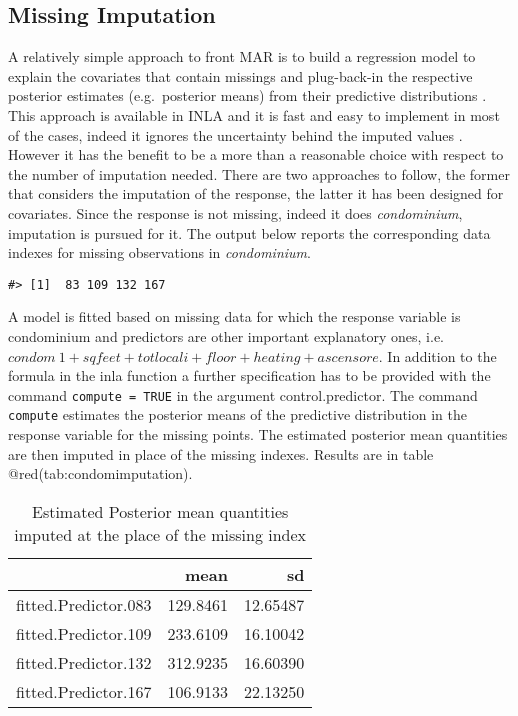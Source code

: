 \documentclass[
  12pt,
  a4paper,
  oneside]{book}
\newcommand{\passthrough}[1]{#1}
\theoremstyle{definition}
\theoremstyle{definition}
\theoremstyle{definition}
\theoremstyle{remark}
\begin{document}
\hypertarget{missing-imputation}{%
\subsection{Missing Imputation}\label{missing-imputation}}

A relatively simple approach to front MAR is to build a regression model to explain the covariates that contain missings and plug-back-in the respective posterior estimates (e.g.~posterior means) from their predictive distributions \citet{Little}. This approach is available in INLA and it is fast and easy to implement in most of the cases, indeed it ignores the uncertainty behind the imputed values \citep{Bayesian_INLA_Rubio}. However it has the benefit to be a more than a reasonable choice with respect to the number of imputation needed. There are two approaches to follow, the former that considers the imputation of the response, the latter it has been designed for covariates.
Since the response is not missing, indeed it does \emph{condominium}, imputation is pursued for it. The output below reports the corresponding data indexes for missing observations in \emph{condominium}.

\begin{lstlisting}
#> [1]  83 109 132 167
\end{lstlisting}

A model is fitted based on missing data for which the response variable is condominium and predictors are other important explanatory ones, i.e.\(condom ~ 1 + sqfeet + totlocali + floor + heating + ascensore\). In addition to the formula in the inla function a further specification has to be provided with the command \passthrough{\lstinline!compute = TRUE!} in the argument control.predictor. The command \passthrough{\lstinline!compute!} estimates the posterior means of the predictive distribution in the response variable for the missing points. The estimated posterior mean quantities are then imputed in place of the missing indexes. Results are in table @red(tab:condomimputation).

\begin{table}

\caption{\label{tab:condomimputation}Estimated Posterior mean quantities imputed at the place of the missing index}
\centering
\begin{tabular}[t]{lrr}
\toprule
  & mean & sd\\
\midrule
fitted.Predictor.083 & 129.8461 & 12.65487\\
fitted.Predictor.109 & 233.6109 & 16.10042\\
fitted.Predictor.132 & 312.9235 & 16.60390\\
fitted.Predictor.167 & 106.9133 & 22.13250\\
\bottomrule
\end{tabular}
\end{table}
\end{document}
